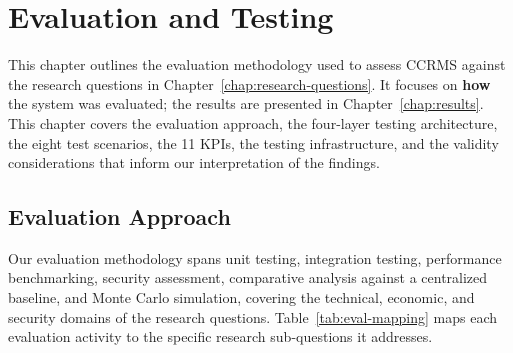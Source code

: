 
\chapter{Evaluation and Testing}\label{chap:evaluation}

This chapter outlines the evaluation methodology used to assess CCRMS against the research questions in Chapter~\ref{chap:research-questions}. It focuses on \textbf{how} the system was evaluated; the results are presented in Chapter~\ref{chap:results}. This chapter covers the evaluation approach, the four-layer testing architecture, the eight test scenarios, the 11 KPIs, the testing infrastructure, and the validity considerations that inform our interpretation of the findings.

\section{Evaluation Approach}\label{sec:eval-approach}

Our evaluation methodology spans unit testing, integration testing, performance benchmarking, security assessment, comparative analysis against a centralized baseline, and Monte Carlo simulation, covering the technical, economic, and security domains of the research questions. Table~\ref{tab:eval-mapping} maps each evaluation activity to the specific research sub-questions it addresses.

